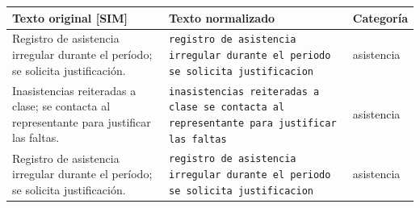 \begin{tabular}{p{5.6cm}p{5.6cm}l}
\toprule
Texto original [SIM] & Texto normalizado & Categoría \\
\midrule
\footnotesize Registro de asistencia irregular durante el período; se solicita justificación. & \footnotesize\texttt{registro de asistencia irregular durante el periodo se solicita justificacion} & asistencia \\
\footnotesize Inasistencias reiteradas a clase; se contacta al representante para justificar las faltas. & \footnotesize\texttt{inasistencias reiteradas a clase se contacta al representante para justificar las faltas} & asistencia \\
\footnotesize Registro  de  asistencia irregular durante el período; se solicita justificación. & \footnotesize\texttt{registro de asistencia irregular durante el periodo se solicita justificacion} & asistencia \\
\bottomrule
\end{tabular}
